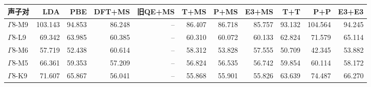 \begin{tabular}{lrrrrrrrrrr}
\toprule
声子对 & LDA & PBE & DFT+MS & 旧QE+MS & T+MS & P+MS & E3+MS & T+T & P+P & E3+E3 \\
\midrule
$\Gamma$8-M9 & 103.143 & 94.853 & 86.248 & -- & 86.407 & 86.718 & 85.757 & 93.132 & 104.564 & 94.245 \\
$\Gamma$8-L9 & 69.342 & 63.985 & 60.385 & -- & 60.310 & 60.072 & 60.133 & 62.824 & 71.579 & 65.114 \\
$\Gamma$8-M6 & 57.719 & 52.438 & 60.614 & -- & 58.312 & 53.828 & 57.555 & 50.709 & 42.345 & 53.882 \\
$\Gamma$8-M5 & 66.361 & 59.353 & 57.209 & -- & 56.824 & 56.535 & 56.742 & 59.854 & 60.114 & 58.172 \\
$\Gamma$8-K9 & 71.607 & 65.867 & 56.041 & -- & 55.868 & 55.901 & 55.826 & 63.639 & 74.487 & 66.270 \\
\bottomrule
\end{tabular}
